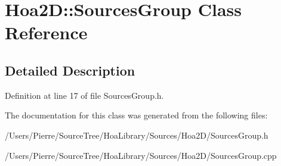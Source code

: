 \hypertarget{class_hoa2_d_1_1_sources_group}{\section{Hoa2\-D\-:\-:Sources\-Group Class Reference}
\label{class_hoa2_d_1_1_sources_group}
}


\subsection{Detailed Description}


Definition at line 17 of file Sources\-Group.\-h.



The documentation for this class was generated from the following files\-:\begin{DoxyCompactItemize}
\item 
/\-Users/\-Pierre/\-Source\-Tree/\-Hoa\-Library/\-Sources/\-Hoa2\-D/Sources\-Group.\-h\item 
/\-Users/\-Pierre/\-Source\-Tree/\-Hoa\-Library/\-Sources/\-Hoa2\-D/Sources\-Group.\-cpp\end{DoxyCompactItemize}
